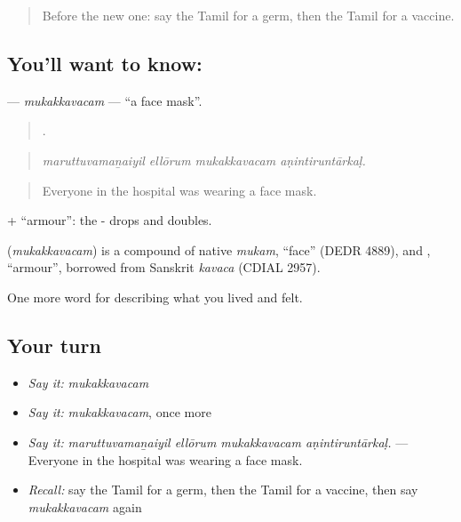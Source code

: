 \label{lesson:TA-C476-mukakkavacam}



\begin{quote}
Before the new one: say the Tamil for a germ, then the Tamil for a vaccine.
\end{quote}

\subsection*{You'll want to know: }
\textbf{} — \emph{mukakkavacam} — \textquotedblleft{}a face mask\textquotedblright{}.

\begin{quote}
   .
\end{quote}

\begin{quote}
\emph{maruttuvamaṉaiyil ellōrum mukakkavacam aṇintiruntārkaḷ.}
\end{quote}

\begin{quote}
Everyone in the hospital was wearing a face mask.
\end{quote}

 +  \textquotedblleft{}armour\textquotedblright{}: the - drops and  doubles.

\begin{cousinweb}
\textbf{} (\emph{mukakkavacam}) is a compound of native  \emph{mukam}, \textquotedblleft{}face\textquotedblright{} (DEDR 4889), and , \textquotedblleft{}armour\textquotedblright{}, borrowed from Sanskrit \emph{kavaca} (CDIAL 2957).
\end{cousinweb}

\begin{grammarlens}[title={What you've built}]
One more word for describing what you lived and felt.
\end{grammarlens}

\subsection*{Your turn}
\begin{itemize}
\raggedright
  \item \emph{Say it:} \emph{mukakkavacam}
  \item \emph{Say it:} \emph{mukakkavacam}, once more
  \item \emph{Say it:} \emph{maruttuvamaṉaiyil ellōrum mukakkavacam aṇintiruntārkaḷ.} — Everyone in the hospital was wearing a face mask.
  \item \emph{Recall:} say the Tamil for a germ, then the Tamil for a vaccine, then say \emph{mukakkavacam} again
\end{itemize}

